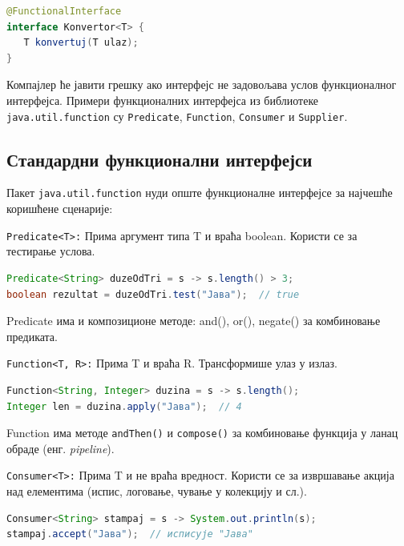 \begin{lstlisting}[language=Java]
@FunctionalInterface
interface Konvertor<T> {
   T konvertuj(T ulaz);
}
\end{lstlisting}


Компајлер ће јавити грешку ако интерфејс не задовољава услов функционалног интерфејса. Примери функционалних интерфејса из библиотеке \texttt{java.util.function} су \texttt{Predicate}, \texttt{Function}, \texttt{Consumer} и \texttt{Supplier}.


\subsection{Стандардни функционални интерфејси}

Пакет \texttt{java.util.function} нуди опште функционалне интерфејсе за најчешће коришћене сценарије:

\texttt{Predicate\textless{}T\textgreater{}:} Прима аргумент типа T и враћа boolean. Користи се за тестирање услова.

\begin{lstlisting}[language=Java]
Predicate<String> duzeOdTri = s -> s.length() > 3;
boolean rezultat = duzeOdTri.test("Јава");  // true
\end{lstlisting}


Predicate има и композиционе методе: and(), or(), negate() за комбиновање предиката.

\texttt{Function\textless{}T, R\textgreater{}:} Прима T и враћа R. Трансформише улаз у излаз.

\begin{lstlisting}[language=Java]
Function<String, Integer> duzina = s -> s.length();
Integer len = duzina.apply("Јава");  // 4
\end{lstlisting}


Function има методе \texttt{andThen()} и \texttt{compose()} за комбиновање функција у ланац обраде (енг. \textit{pipeline}).

\texttt{Consumer\textless{}T\textgreater{}:} Прима T и не враћа вредност. Користи се за извршавање акција над елементима (испис, логовање, чување у колекцију и сл.).

\begin{lstlisting}[language=Java]
Consumer<String> stampaj = s -> System.out.println(s);
stampaj.accept("Јава");  // исписује "Јава"
\end{lstlisting}


